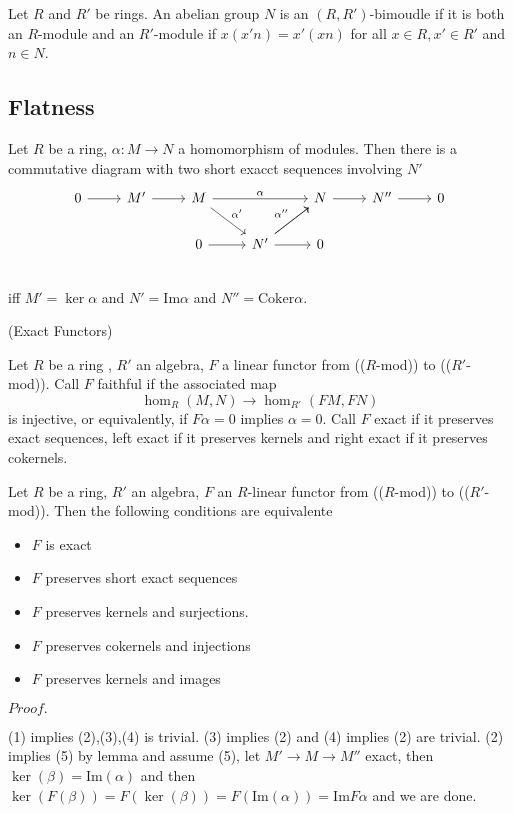 \documentclass{article}
\newcommand{\Pf}[1]{$Proof.$\par}
\begin{document}
\begin{definition}
    Let $R$ and $R'$ be rings. An abelian group $N$ is an $(R,R')$-bimoudle if it is both an $R$-module and an $R'$-module if $x(x'n) = x'(xn)$ for all $x\in R,x'\in R'$ and $n\in N$.
\end{definition}

\subsection{Flatness}

\begin{lemma}
    Let $R$ be a ring, $\alpha:M\to N$ a homomorphism of modules. Then there is a commutative diagram with two short exacct sequences involving $N'$
    \[
    \begin{tikzcd}
        0\arrow[r] & M'\arrow[r] & M\arrow[rd,"\alpha'"]\arrow[rr,"\alpha"] & & N\arrow[r]& N''\arrow[r] & 0 \\
          & & 0\arrow[r] & N'\arrow[r]\arrow[ru,"\alpha''"]\arrow[ru] & 0 \\      
    \end{tikzcd}
    \]
    iff $M' = \ker\alpha$ and $N' = \text{Im}\alpha$ and $N'' = \text{Coker}\alpha$. 
\end{lemma}

\begin{definition}
    (Exact Functors)\par
    Let $R$ be a ring , $R'$ an algebra, $F$ a linear functor from (($R$-mod)) to (($R'$-mod)). Call $F$ faithful if the associated map
    \[
    \hom_R(M,N) \to \hom_{R'}(FM,FN)
    \]
    is injective, or equivalently, if $F\alpha = 0$ implies $\alpha = 0$. Call $F$ exact if it preserves exact sequences, left exact if it preserves kernels and right exact if it preserves cokernels.
\end{definition}

\begin{proposition}
    Let $R$ be a ring, $R'$ an algebra, $F$ an $R$-linear functor from (($R$-mod)) to (($R'$-mod)). Then the following conditions are equivalente
    \begin{itemize}
        \item $F$ is exact
        \item $F$ preserves short exact sequences
        \item $F$ preserves kernels and surjections.
        \item $F$ preserves cokernels and injections
        \item $F$ preserves kernels and images
    \end{itemize}
\end{proposition}
\Pf\par
    (1) implies (2),(3),(4) is trivial. (3) implies (2) and (4) implies (2) are trivial. (2) implies (5) by lemma and assume (5), let $M'\to M \to M''$ exact, then $\ker(\beta) = \text{Im}(\alpha)$ and then $\ker(F(\beta)) = F(\ker(\beta)) = F(\text{Im}(\alpha)) = \text{Im}F\alpha$ and we are done.
\end{document}
